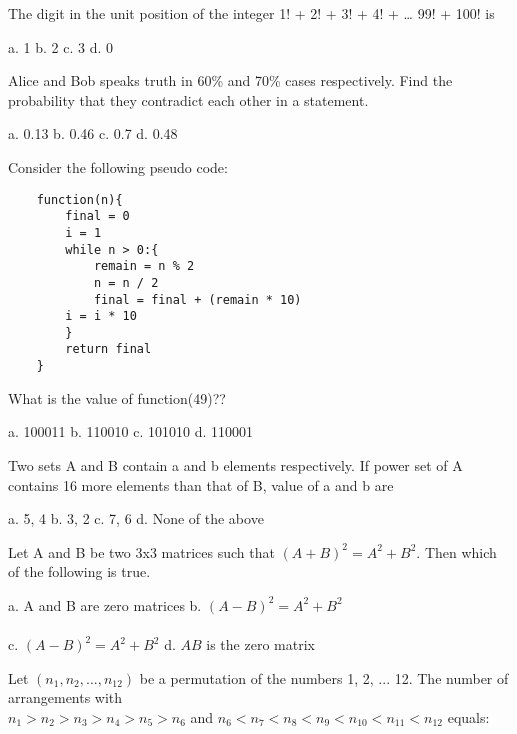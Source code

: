 \documentclass[a4paper, addpoints]{exam}
\begin{document}
\begin{questions}
	\question The digit in the unit position of the integer 1! + 2! + 3! + 4! + … 99! + 100! is \\
	
	\begin{oneparcheckboxes}
		\choice a. 1
		\choice b. 2
		\choice c. 3
		\choice d. 0
	\end{oneparcheckboxes}
	\question Alice and Bob speaks truth in 60\% and 70\% cases respectively. Find the probability that they contradict each other in a statement.\\
	
		\begin{oneparcheckboxes}
		\choice a. 0.13
		\choice b. 0.46
		\choice c. 0.7
		\choice d. 0.48
	\end{oneparcheckboxes}
	\question Consider the following pseudo code:
	\begin{verbatim}
	function(n){
		final = 0
		i = 1
		while n > 0:{
			remain = n % 2
			n = n / 2
			final = final + (remain * 10)
		i = i * 10
		}
		return final
	}
	\end{verbatim}
	What is the value of function(49)??\\
	
	\begin{oneparcheckboxes}
		\choice a. 100011
		\choice b. 110010
		\choice c. 101010
		\choice d. 110001
	\end{oneparcheckboxes}
	
	\question Two sets A and B contain a and b elements respectively. If power set of A contains 16 more elements than that of B, value of a and b are\\

	\begin{oneparcheckboxes}
		\choice a. 5, 4
		\choice b. 3, 2
		\choice c. 7, 6
		\choice d. None of the above
	\end{oneparcheckboxes}
	\question Let A and B be two 3x3 matrices such that $(A+B)^2 = A^2 + B^2.$ Then which of the following is true.\\
	
	\begin{oneparcheckboxes}
		\choice a. A and B are zero matrices
		\choice b. $(A - B)^2 = A^2 + B^2$\\\\
		\choice c. $(A - B)^2 = A^2 + B^2$
		\choice d. $AB$ is the zero matrix
	\end{oneparcheckboxes}
	\question Let $(n_1, n_2, ... , n_{12})$ be a permutation of the numbers 1, 2, ... 12. The number of arrangements with \\ $n_1>n_2>n_3>n_4>n_5>n_6$  and  $n_6<n_7<n_8<n_9<n_{10}<n_{11}<n_{12}$ equals:\\
	

\end{questions}
\end{document}
